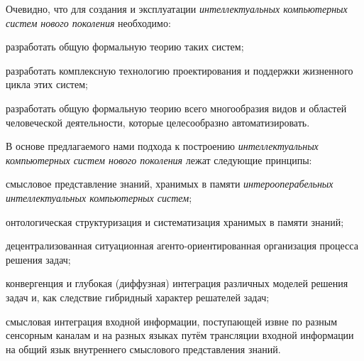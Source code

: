 Очевидно, что для создания и эксплуатации \textit{интеллектуальных компьютерных систем нового поколения} необходимо:
\begin{textitemize}
	\item разработать общую формальную теорию таких систем;
	\item разработать комплексную технологию проектирования и поддержки жизненного цикла этих систем;
	\item разработать общую формальную теорию всего многообразия видов и областей человеческой деятельности, которые целесообразно автоматизировать.
\end{textitemize}

В основе предлагаемого нами подхода к построению \textit{интеллектуальных компьютерных систем нового поколения} лежат следующие принципы:
\begin{textitemize}
	\item смысловое представление знаний, хранимых в памяти \textit{интерооперабельных интеллектуальных компьютерных систем};
	\item онтологическая структуризация и систематизация хранимых в памяти знаний;
	\item децентрализованная ситуационная агенто-ориентированная организация процесса решения задач;
	\item конвергенция и глубокая (диффузная) интеграция различных моделей решения задач и, как следствие гибридный характер решателей задач;
	\item смысловая интеграция входной информации, поступающей извне по разным сенсорным каналам и на разных языках путём трансляции входной информации на общий язык внутреннего смыслового представления знаний.
\end{textitemize}

\begin{SCn}
	\begin{scnhaselementset}
		\begin{scnindent}
			\begin{scnindent}
			\end{scnindent}
		\end{scnindent} 
	\end{scnhaselementset}\scnheader{}
\end{SCn}

